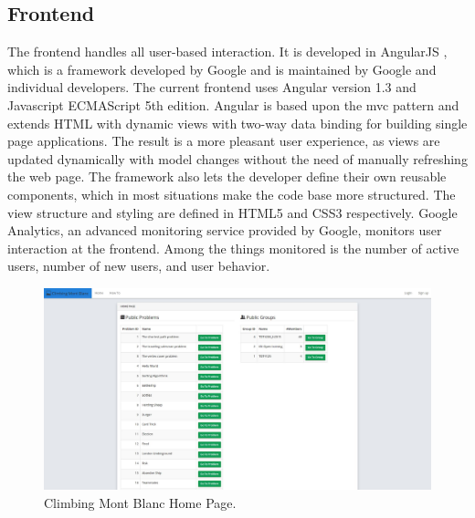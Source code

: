 \subsection{Frontend}
\label{subsec:cmb-arch-frontend}
The frontend handles all user-based interaction. It is developed in AngularJS \cite{ANGULARJS}, which is a framework developed by Google and is maintained by Google and individual developers. The current frontend uses Angular version 1.3 and Javascript ECMAScript 5th edition. Angular is based upon the \gls{mvc} pattern \cite{b:mvc} and extends HTML with dynamic views with two-way data binding for building single page applications. The result is a more pleasant user experience, as views are updated dynamically with model changes without the need of manually refreshing the web page. The framework also lets the developer define their own reusable components, which in most situations make the code base more structured. The view structure and styling are defined in HTML5 and CSS3 respectively. Google Analytics, an advanced monitoring service provided by Google, monitors user interaction at the frontend. Among the things monitored is the number of active users, number of new users, and user behavior. \\

\begin{figure}
    \centering
    \includegraphics[width=1\textwidth]{figs/front_page.jpg}
    \caption{Climbing Mont Blanc Home Page.}
    \label{fig:front-page}
\end{figure}

